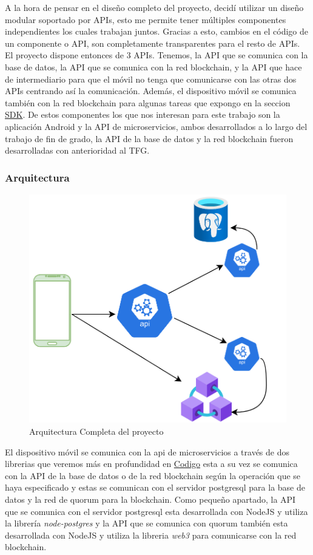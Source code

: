 A la hora de pensar en el diseño completo del proyecto, decidí utilizar un diseño modular soportado por APIs, esto me permite tener múltiples componentes independientes los cuales trabajan juntos. Gracias a esto, cambios en el código de un componente o API, son completamente transparentes para el resto de APIs. El proyecto dispone entonces de 3 APIs. Tenemos, la API que se comunica con la base de datos, la API que se comunica con la red blockchain, y la API que hace de intermediario para que el móvil no tenga que comunicarse con las otras dos APIs centrando así la comunicación. Además, el dispositivo móvil se comunica también con la red blockchain para algunas tareas que expongo en la seccion \hyperref[sec:SDK]{SDK}. De estos componentes los que nos interesan para este trabajo son la aplicación Android y la API de microservicios, ambos desarrollados a lo largo del trabajo de fin de grado, la API de la base de datos y la red blockchain fueron desarrolladas con anterioridad al TFG. 

\subsubsection{Arquitectura}
\begin{figure}[h!]
  \centering
  \includegraphics[width=0.6\linewidth]{figs/Desarrollo/Arquitectura}
  \caption[Arquitectura]{Arquitectura Completa del proyecto}
  \label{fig:estublockArch}
\end{figure}

El dispositivo móvil se comunica con la api de microservicios a través de dos librerias que veremos más en profundidad en \hyperref[sec:Codigo]{Codigo} esta a su vez se comunica con la API de la base de datos o de la red blockchain según la operación que se haya especificado y estas se comunican con el servidor postgresql para la base de datos y la red de quorum para la blockchain. Como pequeño apartado, la API que se comunica con el servidor postgresql esta desarrollada con NodeJS y utiliza la librería \emph{node-postgres} y la API que se comunica con quorum también esta desarrollada con NodeJS y utiliza la libreria \emph{web3} para comunicarse con la red blockchain. 

